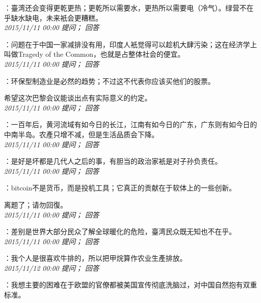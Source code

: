\documentclass[twocolumn]{ctexart}
\begin{document}
：臺湾还会变得更乾更热；更乾所以需要水，更热所以需要电（冷气）。绿营不在乎缺水缺电，未来衹会更糟糕。\\

\textit{\hfill\noindent\small 2015/11/11 00:00 提问； 回答}

：问题在于中国一家减排没有用，印度人衹觉得可以趁机大肆污染；这在经济学上叫做Tragedy of the Common，也就是占整体社会的便宜。\\

\textit{\hfill\noindent\small 2015/11/11 00:00 提问； 回答}

：环保型制造业是必然的趋势；不过这不代表你应该买他们的股票。

希望这次巴黎会议能谈出点有实际意义的约定。\\

\textit{\hfill\noindent\small 2015/11/11 00:00 提问； 回答}

：一百年后，黄河流域有如今日的长江，江南有如今日的广东，广东则有如今日的中南半岛。农產只增不减，但是生活品质会下降。\\

\textit{\hfill\noindent\small 2015/11/11 00:00 提问； 回答}

：是好是坏都是几代人之后的事，有胆当的政治家衹是对子孙负责任。\\

\textit{\hfill\noindent\small 2015/11/11 00:00 提问； 回答}

：bitcoin不是货币，而是投机工具；它真正的贡献在于软体上的一些创新。

离题了；请勿回復。\\

\textit{\hfill\noindent\small 2015/11/11 00:00 提问； 回答}

：差别是世界大部分民众了解全球暖化的危险，臺湾民众既无知也不在乎。\\

\textit{\hfill\noindent\small 2015/11/11 00:00 提问； 回答}

：我个人是很喜欢牛排的，所以把甲烷算作农业生產排放。\\

\textit{\hfill\noindent\small 2015/11/12 00:00 提问； 回答}

：我想主要的困难在于欧盟的官僚都被美国宣传彻底洗脑过，对中国自然抱有双重标准。\\
\end{document}
